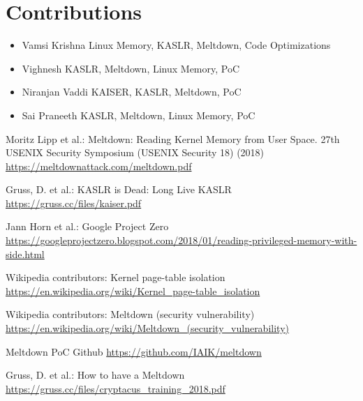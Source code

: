\documentclass[runningheads]{llncs}
\begin{document}
\section{Contributions}

\begin{itemize}
    \item Vamsi Krishna \hfill     Linux Memory, KASLR, Meltdown, Code Optimizations\hspace{7pt}
    \item Vighnesh \hfill  KASLR, Meltdown, Linux Memory, PoC \hspace{7pt}
    \item Niranjan Vaddi\hfill  \hspace*{-7pt} KAISER, KASLR, Meltdown, PoC
    \item Sai Praneeth \hfill \hspace*{-7pt} KASLR, Meltdown, Linux Memory, PoC
\end{itemize}

%
%

%
%
%

% 
%
\begin{thebibliography}{8}
Moritz Lipp et al.: Meltdown: Reading Kernel Memory from User Space. 27th {USENIX} Security Symposium ({USENIX} Security 18) (2018) \url{https://meltdownattack.com/meltdown.pdf}

Gruss, D. et al.: KASLR is Dead: Long Live KASLR
\url{https://gruss.cc/files/kaiser.pdf}

Jann Horn et al.: Google Project Zero
\url{https://googleprojectzero.blogspot.com/2018/01/reading-privileged-memory-with-side.html}

Wikipedia contributors: Kernel page-table isolation
\url{https://en.wikipedia.org/wiki/Kernel_page-table_isolation}

Wikipedia contributors: Meltdown (security vulnerability)
\url{https://en.wikipedia.org/wiki/Meltdown_(security_vulnerability)}

Meltdown PoC Github
\url{https://github.com/IAIK/meltdown}

Gruss, D. et al.: How to have a Meltdown
\url{https://gruss.cc/files/cryptacus_training_2018.pdf}

\end{thebibliography}
\end{document}
